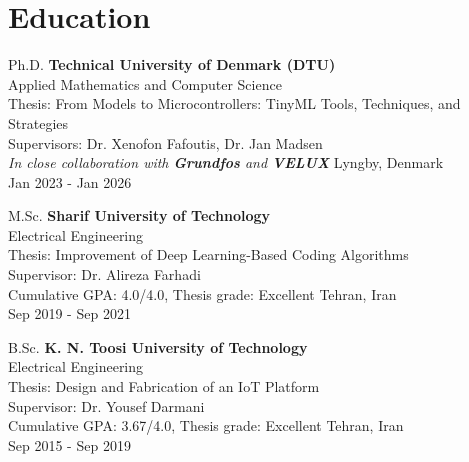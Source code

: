 
\section{Education}
    
    \multicolentry{1.2cm, *, 3.5cm}
    {Ph.D.}
    {
        \textbf{Technical University of Denmark (DTU)}\\
        Applied Mathematics and Computer Science\\
        Thesis: From Models to Microcontrollers: TinyML Tools, Techniques, and Strategies\\
        Supervisors: Dr. Xenofon Fafoutis, Dr. Jan Madsen\\
        \textit{\small In close collaboration with \textbf{Grundfos} and \textbf{VELUX}}
    }
    {\raggedleft
        Lyngby, Denmark\\
        Jan 2023 - Jan 2026
    }
    
    \vspace{0.2 cm}
    
    \multicolentry{1.2cm, *, 3.5cm}
    {M.Sc.}
    {
        \textbf{Sharif University of Technology}\\
        Electrical Engineering\\
        Thesis: Improvement of Deep Learning-Based Coding Algorithms\\
        Supervisor: Dr. Alireza Farhadi\\
        Cumulative GPA: 4.0/4.0, Thesis grade: Excellent
    }
    {\raggedleft
        Tehran, Iran\\
        Sep 2019 - Sep 2021
    }
    
    \vspace{0.2 cm}
    
    \multicolentry{1.2cm, *, 3.5cm}
    {B.Sc.}
    {
        \textbf{K. N. Toosi University of Technology}\\
        Electrical Engineering\\
        Thesis: Design and Fabrication of an IoT Platform\\
        Supervisor: Dr. Yousef Darmani\\
        Cumulative GPA: 3.67/4.0, Thesis grade: Excellent
    }
    {\raggedleft
        Tehran, Iran\\
        Sep 2015 - Sep 2019
    }
